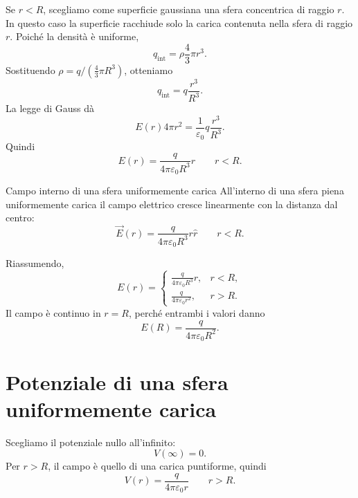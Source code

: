 \documentclass[a4paper]{article}
\begin{document}
Se \(r<R\), scegliamo come superficie gaussiana una sfera concentrica di raggio \(r\). In questo caso la superficie racchiude solo la carica contenuta nella sfera di raggio \(r\). Poiché la densità è uniforme,
\[
    q_{\mathrm{int}}=\rho\frac{4}{3}\pi r^3.
\]
Sostituendo \(\rho=q/(\frac{4}{3}\pi R^3)\), otteniamo
\[
    q_{\mathrm{int}}=q\frac{r^3}{R^3}.
\]
La legge di Gauss dà
\[
    E(r)4\pi r^2=\frac{1}{\varepsilon_0}q\frac{r^3}{R^3}.
\]
Quindi
\[
    E(r)=\frac{q}{4\pi\varepsilon_0R^3}r
    \qquad r<R.
\]

\begin{snippetproposition}{Campo interno di una sfera uniformemente carica}
    All'interno di una sfera piena uniformemente carica il campo elettrico cresce linearmente con la distanza dal centro:
    \[
        \vec{E}(r)=\frac{q}{4\pi\varepsilon_0R^3}r\hat{r}
        \qquad r<R.
    \]
\end{snippetproposition}

Riassumendo,
\[
    E(r)=
    \begin{cases}
        \displaystyle \frac{q}{4\pi\varepsilon_0R^3}r, & r<R,\\[6pt]
        \displaystyle \frac{q}{4\pi\varepsilon_0r^2}, & r>R.
    \end{cases}
\]
Il campo è continuo in \(r=R\), perché entrambi i valori danno
\[
    E(R)=\frac{q}{4\pi\varepsilon_0R^2}.
\]

\begin{center}
\end{center}

\section{Potenziale di una sfera uniformemente carica}

Scegliamo il potenziale nullo all'infinito:
\[
    V(\infty)=0.
\]
Per \(r>R\), il campo è quello di una carica puntiforme, quindi
\[
    V(r)=\frac{q}{4\pi\varepsilon_0r}
    \qquad r>R.
\]
\end{document}
